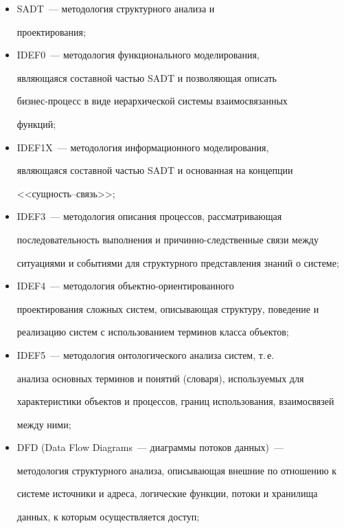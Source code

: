       \begin{itemize}


       \item  SADT~--- методология структурного анализа и 


проектирования;


       \item IDEF0~--- методология функционального моделирования, 


являющаяся составной частью SADT и позволяющая описать 


       биз\-нес-про\-цесс в виде иерархической системы взаимосвязанных 


функций; 


       \item IDEF1X~--- методология информационного моделирования, 


являющаяся составной частью SADT и основанная на концепции 


<<сущность--связь>>; 


       \item IDEF3~--- методология описания процессов, рассматривающая 


последовательность выполнения и причинно-следственные связи между 


ситуациями и событиями для структурного представления знаний о системе; 


       \item IDEF4~--- методология объектно-ориентированного 


проектирования сложных систем, описывающая структуру, поведение и 


реализацию систем с использованием терминов класса объектов; 


       \item IDEF5~--- методология онтологического анализа систем, т.\,е.\ 


анализа основных терминов и понятий (словаря), используемых для 


характеристики объектов и процессов, границ использования, взаимосвязей 


между ними; 


       \item DFD (Data Flow Diagrams~--- диаграммы потоков данных)~--- 


методология структурного анализа, описывающая внешние по отношению к 


системе источники и адреса, логические функции, потоки и хранилища 


данных, к которым осуществляется доступ; 



\end{itemize}
